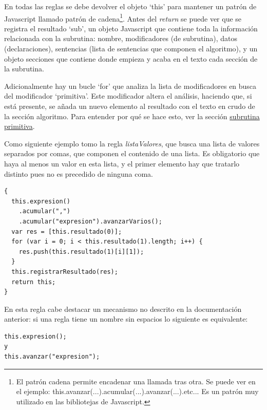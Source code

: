 \documentclass{report}
\begin{document}
	\vspace{10px}
	
	En todas las reglas se debe devolver el objeto `this' para mantener un patrón de Javascript llamado patrón de cadena\footnote{El patrón cadena permite encadenar una llamada tras otra. Se puede ver en el ejemplo: this.avanzar(...).acumular(...).avanzar(...).etc... Es un patrón muy utilizado en las bibliotejas de Javascript.}. Antes del \textit{return} se puede ver que se registra el resultado `sub', un objeto Javascript que contiene toda la información relacionada con la subrutina: nombre, modificadores (de subrutina), datos (declaraciones), sentencias (lista de sentencias que componen el algoritmo), y un objeto secciones que contiene donde empieza y acaba en el texto cada sección de la subrutina. 
	
	\vspace{10px}
	
	Adicionalmente hay un bucle `for' que analiza la lista de modificadores en busca del modificador `primitiva'. Este modificador altera el análisis, haciendo que, si está presente, se añada un nuevo elemento al resultado con el texto en crudo de la sección algoritmo. Para entender por qué se hace esto, ver la sección \hyperref[subrutinasprimitivas]{subrutina primitiva}.
	
	\vspace{10px}
	
	Como siguiente ejemplo tomo la regla \textit{listaValores}, que busca una lista de valores separados por comas, que componen el contenido de una lista. Es obligatorio que haya al menos un valor en esta lista, y el primer elemento hay que tratarlo distinto pues no es precedido de ninguna coma.
	
\begin{BVerbatim}
{
  this.expresion()
    .acumular(",")
    .acumular("expresion").avanzarVarios();
  var res = [this.resultado(0)];
  for (var i = 0; i < this.resultado(1).length; i++) {
    res.push(this.resultado(1)[i][1]);
  }
  this.registrarResultado(res);
  return this;
}
\end{BVerbatim}

	\vspace{10px}

	En esta regla cabe destacar un mecanismo no descrito en la documentación anterior: si una regla tiene un nombre sin espacios lo siguiente es equivalente:
	
\begin{BVerbatim}
this.expresion();
y
this.avanzar("expresion");
\end{BVerbatim}	
\end{document}
